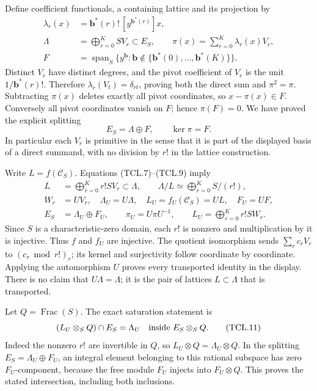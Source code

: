 Define coefficient functionals, a containing lattice and its projection by
\[
 \begin{split}
 \lambda_r(x)&=\mathbf b^*(r)!\,[y^{\mathbf b^*(r)}]x,\\
 \Lambda&=\bigoplus_{r=0}^K S V_r\subset E_S,\qquad
 \pi(x)=\sum_{r=0}^K\lambda_r(x)V_r,\\
 F&=\operatorname{span}_S
       \{y^{\mathbf b}:\mathbf b\notin\{\mathbf b^*(0),\ldots,
                                                   \mathbf b^*(K)\}\}.
 \end{split}
 \tag{TCL.8}\label{eq:tcl-splitting}
\]
Distinct \(V_r\) have distinct degrees, and the pivot coefficient
of \(V_r\) is the unit \(1/\mathbf b^*(r)!\). Therefore
\(\lambda_r(V_t)=\delta_{rt}\), proving both the direct sum and
\(\pi^2=\pi\). Subtracting \(\pi(x)\) deletes exactly all pivot
coordinates, so \(x-\pi(x)\in F\). Conversely all pivot
coordinates vanish on \(F\); hence \(\pi(F)=0\). We have proved
the explicit splitting
\[
 E_S=\Lambda\oplus F,\qquad \ker\pi=F.
 \tag{TCL.9}\label{eq:tcl-direct}
\]
In particular each \(V_r\) is primitive in the sense that it is
part of the displayed basis of a direct summand, with no division
by \(r!\) in the lattice construction.

Write \(L=f(\mathcal C_S)\). Equations (TCL.7)--(TCL.9) imply
\[
 \begin{split}
 L&=\bigoplus_{r=0}^K r!S V_r\subset\Lambda,\qquad
 \Lambda/L\simeq\bigoplus_{r=0}^K S/(r!),\\
 W_r&=U V_r,\quad \Lambda_U=U\Lambda,
 \quad L_U=f_U(\mathcal C_S)=UL,\quad F_U=UF,\\
 E_S&=\Lambda_U\oplus F_U,\qquad
 \pi_U=U\pi U^{-1},\qquad
 L_U=\bigoplus_{r=0}^K r!S W_r.
 \end{split}
 \tag{TCL.10}\label{eq:tcl-unit-lattices}
\]
Since \(S\) is a characteristic-zero domain, each \(r!\) is
nonzero and multiplication by it is injective. Thus \(f\) and
\(f_U\) are injective. The quotient isomorphism sends
\(\sum_r c_r V_r\) to \((c_r\bmod r!)_r\); its kernel and
surjectivity follow coordinate by coordinate. Applying the
automorphism \(U\) proves every transported identity in the
display. There is no claim that \(U\Lambda=\Lambda\); it is the
pair of lattices \(L\subset\Lambda\) that is transported.

Let \(Q=\operatorname{Frac}(S)\). The exact saturation statement is
\[
 (L_U\otimes_S Q)\cap E_S=\Lambda_U
       \quad\hbox{inside }E_S\otimes_S Q.
 \tag{TCL.11}\label{eq:tcl-saturation}
\]
Indeed the nonzero \(r!\) are invertible in \(Q\), so
\(L_U\otimes Q=\Lambda_U\otimes Q\). In the splitting
\(E_S=\Lambda_U\oplus F_U\), an integral element belonging
to this rational subspace has zero \(F_U\)-component, because
the free module \(F_U\) injects into \(F_U\otimes Q\).
This proves the stated intersection, including both inclusions.

